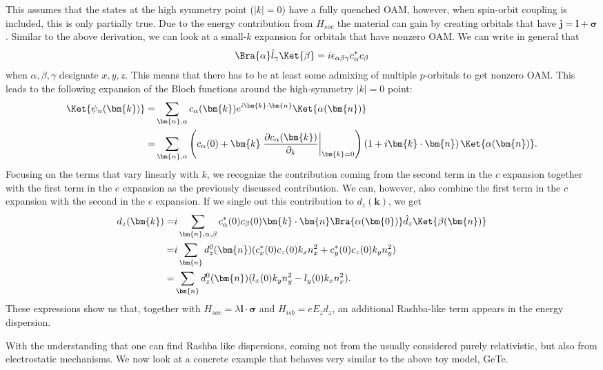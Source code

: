This assumes that the states at the high symmetry point ($|k|=0$) have a fully quenched OAM, however, when spin-orbit coupling is included, this is only partially true. Due to the energy contribution from $H_{soc}$ the material can gain by creating orbitals that have $\bm{j} = \bm{l} + \bm{\sigma}$. Similar to the above derivation, we can look at a small-$k$ expansion for orbitals that have nonzero OAM.
We can write in general that
\begin{equation}
	\Bra{\alpha} \hat{l}_{\gamma} \Ket{\beta} = i \epsilon_{\alpha \beta \gamma} c^*_\alpha c_\beta
\end{equation}
when $\alpha,\beta,\gamma$ designate $x,y,z$. This means that there has to be at least some admixing of multiple $p$-orbitals to get nonzero OAM. This leads to the following expansion of the Bloch functions around the high-symmetry $|k|=0$ point:
\begin{align}
	\Ket{\psi_n(\bm{k})} =& \sum_{\bm{n},\alpha} c_\alpha(\bm{k}) e^{i \bm{k}\cdot\bm{n}}\Ket{\alpha(\bm{n})}\\
	=& \sum_{\bm{n},\alpha} \left(c_\alpha(0) + \bm{k}\left.\frac{\partial c_\alpha(\bm{k})}{\partial_k}\right\rvert_{\bm{k}=0} \right)\left(1 + i\bm{k}\cdot\bm{n}\right)\Ket{\alpha(\bm{n})}.
\end{align}
Focusing on the terms that vary linearly with $k$, we recognize the contribution coming from the second term in the $c$ expansion together with the first term in the $e$ expansion as the previously discussed contribution. We can, however, also combine the first term in the $c$ expansion with the second in the $e$ expansion. If we single out this contribution to $d_z(\bm{k})$, we get
\begin{align}
	\label{eq:d_z_from_OAM}
	d_z(\bm{k}) =&  i\sum_{\bm{n},\alpha,\beta} c_\alpha^*(0)c_\beta(0)\bm{k}\cdot\bm{n}\Bra{\alpha(\bm{0})} \hat{d}_z \Ket{\beta(\bm{n})}\\
	=&i\sum_{\bm{n}} d^0_z(\bm{n}) (c^*_x(0)c_z(0)k_x n_x^2 + c^*_y(0)c_z(0) k_y n_y^2) \\
	=&\sum_{\bm{n}} d^0_z(\bm{n}) (l_x(0)k_y n_y^2-l_y(0) k_x n_x^2).
\end{align}
These expressions show us that, together with $H_{soc} = \lambda \bm{l}\cdot\bm{\sigma}$ and $H_{isb} = e E_z d_z$, an additional Rashba-like term appears in the energy dispersion.

With the understanding that one can find Rashba like dispersions, coming not from the usually considered purely relativistic, but also from electrostatic mechanisms. We now look at a concrete example that behaves very similar to the above toy model, GeTe.

